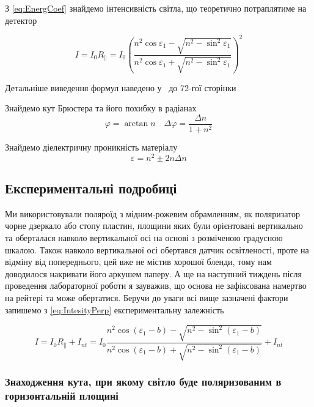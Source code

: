 	З \eqref{eq:EnergCoef} знайдемо інтенсивність світла, що теоретично потраплятиме на детектор
	
	\begin{equation}
		\label{eq:IntesityPerp}
		I=I_0 R_{\parallel}=I_0\left(\frac{n^2\cos\varepsilon_1-\sqrt{n^2-\sin^2\varepsilon_1}}{n^2\cos\varepsilon_1+\sqrt{n^2-\sin^2\varepsilon_1}}\right)^2
	\end{equation}
	
	Детальніше виведення формул наведено у~\cite{BornWolf1999} до 72-гої сторінки
	
	Знайдемо кут Брюстера та його похибку в радіанах
	\begin{equation}
		\label{eq:BrusterAngle}
		\varphi=\arctan n\quad \Delta\varphi=\frac{\Delta n}{1+n^2}
	\end{equation}
	
	Знайдемо діелектричну проникність матеріалу
	\begin{equation}
		\label{eq:RelativePermittivity}
		\varepsilon=n^2\pm 2n\Delta n
	\end{equation}
	
	\subsection{Експериментальні подробиці}
	
	Ми використовували поляроїд з мідним-рожевим обрамленням, як поляризатор чорне дзеркало або стопу пластин, площини яких були орієнтовані вертикально та оберталася навколо вертикальної осі на основі з розміченою градусною шкалою. Також навколо вертикальної осі обертався датчик освітленості, проте на відміну від попереднього, цей вже не містив хорошої бленди, тому нам доводилося накривати його аркушем паперу. А ще на наступний тиждень після проведення лабораторної роботи я зауважив, що основа не зафіксована намертво на рейтері та може обертатися. Беручи до уваги всі вище зазначені фактори запишемо з \eqref{eq:IntesityPerp} експериментальну залежність 
	
	\begin{equation}
		\label{eq:IntesityPerpExper}
		I=I_0 R_{\parallel}+I_{nt}=I_0 \frac{n^2\cos(\varepsilon_1-b)-\sqrt{n^2-\sin^2(\varepsilon_1-b)}}{n^2\cos(\varepsilon_1-b)+\sqrt{n^2-\sin^2(\varepsilon_1-b)}}+I_{nt}
	\end{equation} 
	 
	\subsubsection{Знаходження кута, при якому світло буде поляризованим в горизонтальній площині}
	
